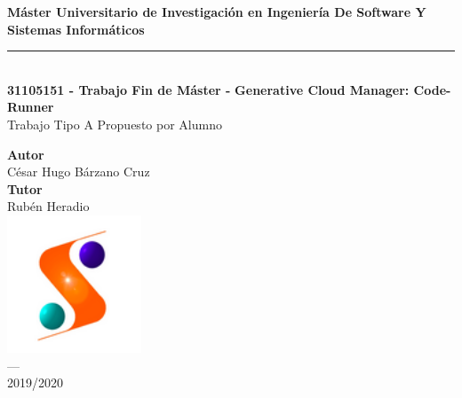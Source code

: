 \begin{titlepage}
 
 

\setlength{\centeroffset}{-0.5\oddsidemargin}
\addtolength{\centeroffset}{0.5\evensidemargin}
\thispagestyle{empty}

\noindent\hspace*{\centeroffset}\begin{minipage}{\textwidth}

\centering


{\Huge\bfseries Máster Universitario de Investigación en Ingeniería De Software Y Sistemas Informáticos\\}

\noindent\rule[-1ex]{\textwidth}{3pt}\\[3.5ex]
{\large\bfseries 31105151 - Trabajo Fin de Máster - }
\textbf{Generative Cloud Manager: Code-Runner}\\[2.5ex]
{Trabajo Tipo  A Propuesto por Alumno}\\[2.5ex]
\end{minipage}

\vspace{2.5cm}
\noindent\hspace*{\centeroffset}\begin{minipage}{\textwidth}
\centering

\textbf{Autor}\\ {César Hugo Bárzano Cruz}\\[2.5ex]
\textbf{Tutor}\\ {Rubén Heradio}\\[2.5ex]


\includegraphics[width=0.3\textwidth]{imagenes/Logo-master.png}\\[0.1cm]
\textsc{---}\\
2019/2020
\end{minipage}

\afterpage{\null\newpage}
\newpage
\end{titlepage}

